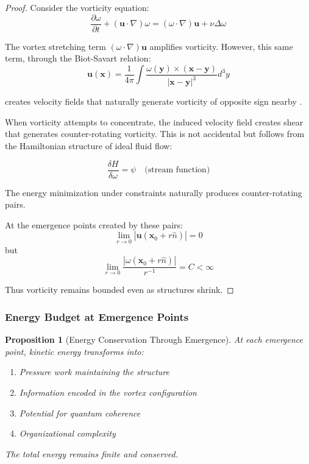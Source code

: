 \documentclass[12pt]{article}
\newcommand{\vorticity}{\omega}
\newtheorem{proposition}[theorem]{Proposition}
\begin{document}
\begin{proof}
Consider the vorticity equation:
\begin{equation}
\frac{\partial \vorticity}{\partial t} + (\mathbf{u} \cdot \nabla)\vorticity = (\vorticity \cdot \nabla)\mathbf{u} + \nu \Delta \vorticity
\end{equation}

The vortex stretching term $(\vorticity \cdot \nabla)\mathbf{u}$ amplifies vorticity. However, this same term, through the Biot-Savart relation:
\begin{equation}
\mathbf{u}(\mathbf{x}) = \frac{1}{4\pi} \int \frac{\vorticity(\mathbf{y}) \times (\mathbf{x} - \mathbf{y})}{|\mathbf{x} - \mathbf{y}|^3} d^3y
\end{equation}

creates velocity fields that naturally generate vorticity of opposite sign nearby \cite{majda2002}.

When vorticity attempts to concentrate, the induced velocity field creates shear that generates counter-rotating vorticity. This is not accidental but follows from the Hamiltonian structure of ideal fluid flow:

\begin{equation}
\frac{\delta H}{\delta \vorticity} = \psi \quad \text{(stream function)}
\end{equation}

The energy minimization under constraints naturally produces counter-rotating pairs.

At the emergence points created by these pairs:
\begin{equation}
\lim_{r \to 0} |\mathbf{u}(\mathbf{x}_0 + r\hat{n})| = 0
\end{equation}
but
\begin{equation}
\lim_{r \to 0} \frac{|\vorticity(\mathbf{x}_0 + r\hat{n})|}{r^{-1}} = C < \infty
\end{equation}

Thus vorticity remains bounded even as structures shrink.
\end{proof}

\subsubsection{Energy Budget at Emergence Points}

\begin{proposition}[Energy Conservation Through Emergence]
At each emergence point, kinetic energy transforms into:
\begin{enumerate}
\item Pressure work maintaining the structure
\item Information encoded in the vortex configuration
\item Potential for quantum coherence
\item Organizational complexity
\end{enumerate}
The total energy remains finite and conserved.
\end{proposition}
\end{document}
